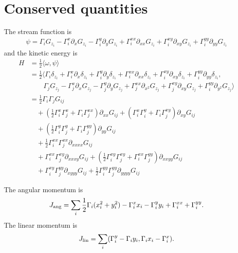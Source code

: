 \documentclass[12pt]{amsart}
\begin{document}
\section{Conserved quantities}
The stream function is
\begin{align*}
  \psi = \Gamma_i G_{z_i}
  - \Gamma_i^x \partial_x G_{z_i}
  - \Gamma_i^y \partial_y G_{z_i}
  + \Gamma_i^{xx} \partial_{xx} G_{z_i} +
  \Gamma_i^{xy} \partial_{xy} G_{z_i} + \Gamma_i^{yy} \partial_{yy} G_{z_i}
\end{align*}
and the kinetic energy is
\begin{align*}
	H &= \frac{1}{2} \langle \omega, \psi \rangle \\
		&= \frac{1}{2} \langle  \Gamma_i \delta_{z_i}
  + \Gamma_i^x \partial_x \delta_{z_i}
  + \Gamma_i^y \partial_y \delta_{z_i}
  + \Gamma_i^{xx} \partial_{xx} \delta_{z_i} +
  \Gamma_i^{xy} \partial_{xy} \delta_{z_i} + \Gamma_i^{yy} \partial_{yy} \delta_{z_i} , \\
  &\qquad \Gamma_j G_{z_j}
  - \Gamma_j^x \partial_x G_{z_j}
  - \Gamma_j^y \partial_y G_{z_j}
  + \Gamma_j^{xx} \partial_{x^2} G_{z_j} +
  \Gamma_j^{xy} \partial_{xy} G_{z_j} + \Gamma_i^{yy} \partial_{y^2} G_{z_j} \rangle \\
  &= \frac{1}{2} \Gamma_i \Gamma_j G_{ij} \\
  &\quad +( \frac{1}{2} \Gamma_i^x \Gamma_j^x + \Gamma_i \Gamma_j^{xx} )\partial_{xx} G_{ij} + (\Gamma_i^x \Gamma_i^y + \Gamma_i \Gamma_j^{xy} ) \partial_{xy} G_{ij} \\
  &\quad +(\frac{1}{2} \Gamma_i^y \Gamma_j^y + \Gamma_i \Gamma_j^{yy}) \partial_{yy}G_{ij} \\
  &\quad + \frac{1}{2} \Gamma_i^{xx} \Gamma_j^{xx} \partial_{xxxx}G_{ij} \\
  &\quad + \Gamma_i^{xx} \Gamma_j^{xy}  \partial_{xxxy}G_{ij} + (\frac{1}{2} \Gamma_i^{xy} \Gamma_j^{xy} + \Gamma_i^{xx} \Gamma_j^{yy})\partial_{xxyy}G_{ij} \\
  &\quad + \Gamma_i^{xy} \Gamma_j^{yy} \partial_{xyyy}G_{ij} + \frac{1}{2} \Gamma_i^{yy} \Gamma_j^{yy} \partial_{yyyy}G_{ij}
\end{align*}

The angular momentum is
\begin{align*}
  J_{\rm ang} =\sum_{i} \frac{1}{2} \Gamma_i (x_i^2 + y_i^2) - \Gamma_i^x x_i - \Gamma_i^y y_i + \Gamma_i^{xx} + \Gamma_i^{yy}.
\end{align*}
The linear momentum is
\begin{align*}
  J_{\rm lin} =\sum_i ( \Gamma_i^y - \Gamma_i y_i , \Gamma_i x_i - \Gamma_i^x).
\end{align*}





\end{document}
